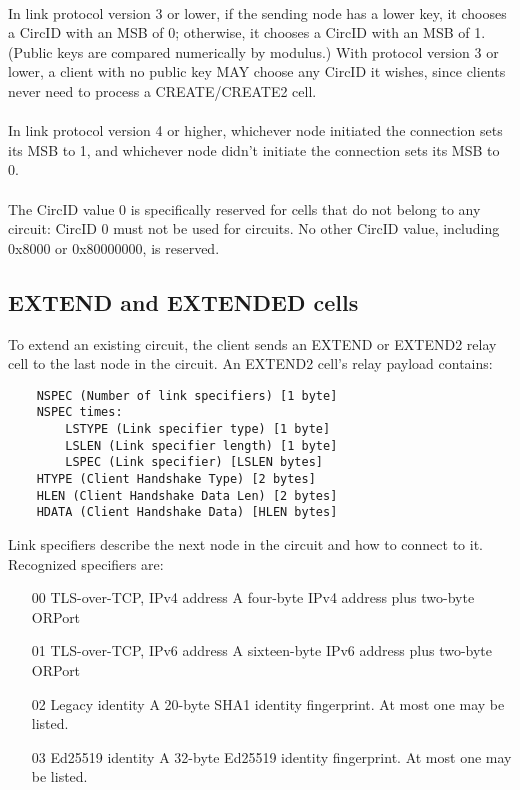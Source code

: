 \paragraph{}
In link protocol version 3 or lower, if the sending node has a lower
key, it chooses a CircID with an MSB of 0; otherwise, it chooses a
CircID with an MSB of 1. (Public keys are compared numerically by
modulus.) With protocol version 3 or lower, a client with no public key
MAY choose any CircID it wishes, since clients never need to process a
CREATE/CREATE2 cell.

\paragraph{}
In link protocol version 4 or higher, whichever node initiated the
connection sets its MSB to 1, and whichever node didn't initiate the
connection sets its MSB to 0.

\paragraph{}
The CircID value 0 is specifically reserved for cells that do not
belong to any circuit: CircID 0 must not be used for circuits. No
other CircID value, including 0x8000 or 0x80000000, is reserved.

\subsection{EXTEND and EXTENDED cells}
To extend an existing circuit, the client sends an EXTEND or EXTEND2
relay cell to the last node in the circuit.
An EXTEND2 cell's relay payload contains:

\begin{verbatim}
    NSPEC (Number of link specifiers) [1 byte]
    NSPEC times:
        LSTYPE (Link specifier type) [1 byte]
        LSLEN (Link specifier length) [1 byte]
        LSPEC (Link specifier) [LSLEN bytes]
    HTYPE (Client Handshake Type) [2 bytes]
    HLEN (Client Handshake Data Len) [2 bytes]
    HDATA (Client Handshake Data) [HLEN bytes]
\end{verbatim}

Link specifiers describe the next node in the circuit and how to
connect to it. Recognized specifiers are:
\begin{itemize}
    \item [00] TLS-over-TCP, IPv4 address
    A four-byte IPv4 address plus two-byte ORPort
    \item [01] TLS-over-TCP, IPv6 address
    A sixteen-byte IPv6 address plus two-byte ORPort
    \item [02] Legacy identity
    A 20-byte SHA1 identity fingerprint. At most one may be listed.
    \item [03] Ed25519 identity
    A 32-byte Ed25519 identity fingerprint. At most one may
    be listed.
\end{itemize}

